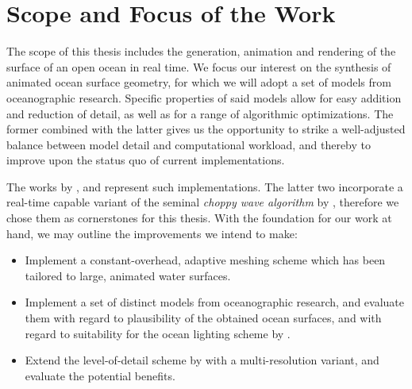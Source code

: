 \section{Scope and Focus of the Work}
\label{sec:scope_and_focus}
The scope of this thesis includes the generation, animation and rendering of the
surface of an open ocean in real time. We focus our interest on the synthesis of
animated ocean surface geometry, for which we will adopt a set of models from
oceanographic research. Specific properties of said models allow for
easy addition and reduction of detail, as well as for a range of algorithmic
optimizations. The former combined with the latter gives us the opportunity to
strike a well-adjusted balance between model detail and computational workload,
and thereby to improve upon the status quo of current implementations.
\textcolor{changed}{
The works by \citet{article:oceanlighting,misc:oceanlightingfft}, and
\citet{article:whitecaps} represent such implementations.
The latter two incorporate a real-time capable variant of the seminal
\emph{choppy wave algorithm} by \citet{course:simulatingocean}, therefore
we chose them as cornerstones for this thesis. With the foundation for
our work at hand, we may outline the improvements we intend to make:
\begin{itemize}
	\item Implement a constant-overhead, adaptive meshing scheme
	\citep{thesis:johanson} which has been tailored to large,
	animated water surfaces.
	\item Implement a set of distinct models from oceanographic
	research, and evaluate them with regard to plausibility
	of the obtained ocean surfaces, and with regard to suitability
	for the	ocean lighting scheme by \citet{article:oceanlighting}.
	\item Extend the level-of-detail scheme by
	\citet{misc:oceanlightingfft} with a multi-resolution variant,
	and evaluate the potential benefits.
\end{itemize}
}

